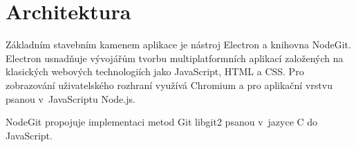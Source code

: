 \chapter{Architektura}
Základním stavebním kamenem aplikace je nástroj Electron a knihovna NodeGit.
Electron usnadňuje vývojářům tvorbu multiplatformních aplikací založených na klasických webových technologiích jako JavaScript, HTML a CSS.
Pro zobrazování uživatelského rozhraní využívá Chromium a pro aplikační vrstvu psanou v~JavaScriptu Node.js.

NodeGit propojuje implementaci metod Git libgit2 psanou v~jazyce C do JavaScript.

